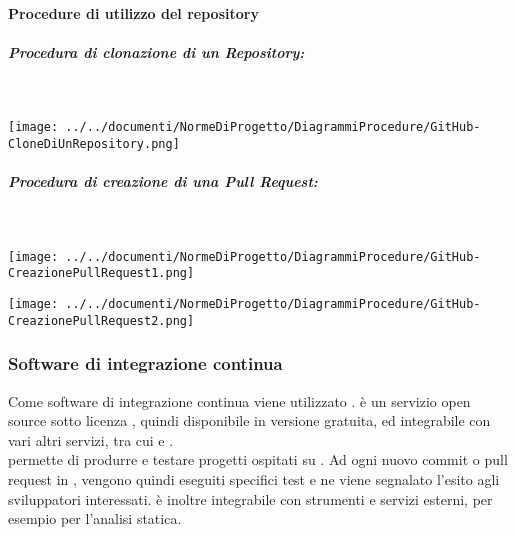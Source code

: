 \paragraph{Procedure di utilizzo del repository}\mbox{}

\begin{samepage}
	\subparagraph{Procedura di clonazione di un Repository:}\mbox{}\\	
	\begin{center}
		\texttt{[image: ../../documenti/NormeDiProgetto/DiagrammiProcedure/GitHub-CloneDiUnRepository.png]}
	\end{center}
\end{samepage}

\begin{samepage}
	\subparagraph{Procedura di creazione di una Pull Request:}\mbox{}\\
	
	\begin{center}
		\texttt{[image: ../../documenti/NormeDiProgetto/DiagrammiProcedure/GitHub-CreazionePullRequest1.png]}
	\end{center}	
\end{samepage}

\begin{center}
	\texttt{[image: ../../documenti/NormeDiProgetto/DiagrammiProcedure/GitHub-CreazionePullRequest2.png]}
\end{center}

\subsubsection{Software di integrazione continua}
Come software di integrazione continua viene utilizzato \textbf{}.
 è un servizio open source sotto licenza , quindi disponibile in versione gratuita,  ed integrabile con vari altri servizi, tra cui  e .\\  permette di produrre e testare progetti ospitati su . Ad ogni nuovo commit o pull request in , vengono quindi eseguiti specifici test e ne viene segnalato l'esito agli sviluppatori interessati.  è inoltre integrabile con strumenti e servizi esterni, per esempio per l'analisi statica.

